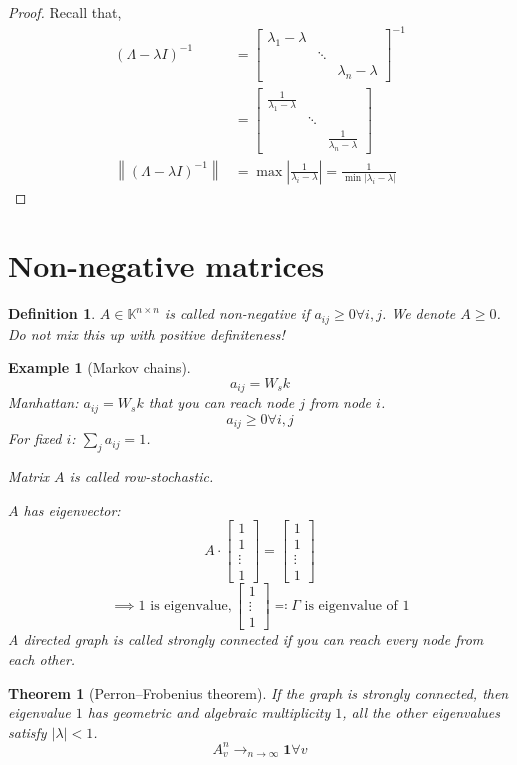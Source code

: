 \documentclass[a4paper]{article}
\newcounter{lecref}[section]
\numberwithin{lecref}{section}
\newtheorem{theorem}[lecref]{Theorem}
\newtheorem*{Example}{Example}
\newtheorem{definition}[lecref]{Definition}
\newcommand{\norm}[1]{\left\|#1\right\|}
\newcommand{\card}[1]{\left|#1\right|}
\begin{document}
\begin{proof}
  Recall that,
  \begin{align*}
    (\Lambda - \lambda I)^{-1}
      &= \begin{bmatrix} \lambda_1 - \lambda & & \\ & \ddots & \\ & & \lambda_n - \lambda \end{bmatrix}^{-1} \\
      &= \begin{bmatrix} \frac{1}{\lambda_1 - \lambda} & & \\ & \ddots & \\ & & \frac{1}{\lambda_n - \lambda} \end{bmatrix} \\
    \norm{(\Lambda - \lambda I)^{-1}} &= \max\card{\frac{1}{\lambda_i - \lambda}} = \frac{1}{\min\card{\lambda_i - \lambda}}
  \end{align*}
\end{proof}

\section{Non-negative matrices}

\begin{definition} %
  $A \in \mathbb K^{n \times n}$ is called \emph{non-negative}
  if $a_{ij} \geq 0 \forall i,j$. We denote $A \geq 0$.
  Do not mix this up with positive definiteness!
\end{definition}

\begin{Example}[Markov chains]
  \[ a_{ij} = W_s k \]
  Manhattan: $a_{ij} = W_s k$ that you can reach node $j$ from node $i$.
  \[ a_{ij} \geq 0 \forall i,j \]
  For fixed $i$: $\sum_j a_{ij} = 1$.

  Matrix $A$ is called \emph{row-stochastic}.

  $A$ has eigenvector:
  \[ A \cdot \begin{bmatrix} 1 \\ 1 \\ \vdots \\ 1 \end{bmatrix} = \begin{bmatrix} 1 \\ 1 \\ \vdots \\ 1 \end{bmatrix} \]
  \[ \implies 1 \text{ is eigenvalue}, \begin{bmatrix} 1 \\ \vdots \\ 1 \end{bmatrix} \eqqcolon \Gamma \text{ is eigenvalue of } 1 \]
  A directed graph is called \emph{strongly connected} if you can reach every node from each other.
\end{Example}

\begin{theorem}[Perron--Frobenius theorem]
  If the graph is strongly connected, then eigenvalue $1$ has geometric and algebraic multiplicity $1$,
  all the other eigenvalues satisfy $\card{\lambda} < 1$.
  \[ A_v^n \to_{n \to \infty} \mathbf 1 \forall v \]
\end{theorem}

\printindex
\end{document}
